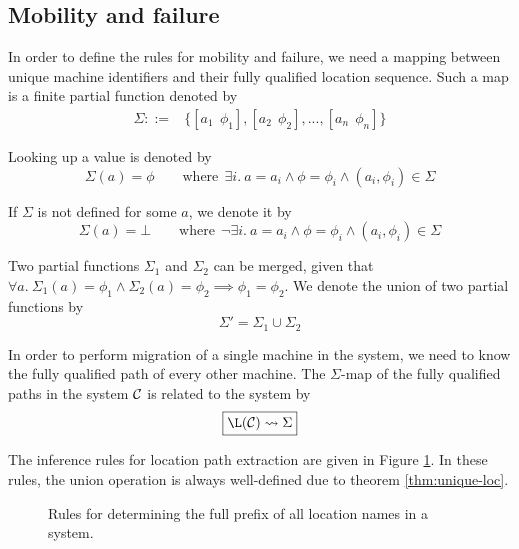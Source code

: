 \subsection{Mobility and failure}

In order to define the rules for mobility and failure, we need a mapping between
unique machine identifiers and their fully qualified location sequence. Such a
map is a finite partial function denoted by
\begin{align*}
\Sigma ::={}&
    \{[a_1~~\phi_1], [a_2~~\phi_2], ..., [a_n~~\phi_n]\}
\end{align*}

Looking up a value is denoted by
\begin{equation*}
 \Sigma(a) = \phi \qquad \textrm{where} \ \  \exists i.~a=a_i \land \phi = \phi_i \land
 (a_i, \phi_i) \in \Sigma
\end{equation*}

If $\Sigma$ is not defined for some $a$, we denote it by
\begin{equation*}
 \Sigma(a) = \bot \qquad \textrm{where} \ \  \neg\exists i.~a=a_i \land \phi = \phi_i \land
 (a_i, \phi_i) \in \Sigma
\end{equation*}

Two partial functions $\Sigma_1$ and $\Sigma_2$ can be merged, given that
$\forall a.~ \Sigma_1(a) = \phi_1 \land \Sigma_2(a) = \phi_2 \implies \phi_1 =
\phi_2$. We denote the union of two partial functions by
\begin{equation*}
 \Sigma' = \Sigma_1 \cup \Sigma_2
\end{equation*}

In order to perform migration of a single machine in the system, we need to
know the fully qualified path of every other machine. The $\Sigma$-map of the
fully qualified paths in the system $\mathcal{C}$ is related to the system by
\begin{equation*}
\boxed{\L(\C) \leadsto \Sigma}
\end{equation*}

The inference rules for location path extraction are given in Figure
\ref{fig:rule:makemap}. In these rules, the union operation is always
well-defined due to theorem \ref{thm:unique-loc}.

\begin{figure}
\caption{Rules for determining the full prefix of all location names in a
system.}\label{fig:rule:makemap}
\end{figure}


